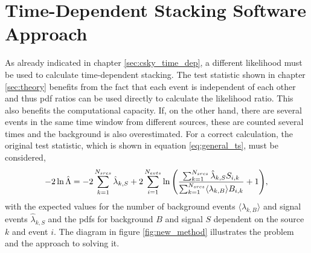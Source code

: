 \chapter{Time-Dependent Stacking Software Approach} \label{sec:tdepps}

As already indicated in chapter \ref{sec:csky_time_dep}, a different likelihood must be used to calculate time-dependent stacking.
The test statistic shown in chapter \ref{sec:theory} benefits from the fact that each event is independent of each other and thus pdf ratios can be used directly to calculate the likelihood ratio.
This also benefits the computational capacity.
If, on the other hand, there are several events in the same time window from different sources, these are counted several times and the background is also overestimated.
For a correct calculation, the original test statistic, which is shown in equation \eqref{eq:general_ts}, must be considered,
\begin{equation}
    -2\ln{\hat{\Lambda}} = -2\sum_{k=1}^{N_{srcs}}\hat{\lambda}_{k,S} + 2\sum_{i=1}^{N_{evts}}\ln{\left(\frac{\sum_{k=1}^{N_{srcs}}\hat{\lambda}_{k,S}S_{i,k}}{\sum_{k=1}^{N_{srcs}}\langle\lambda_{k,B}\rangle B_{i,k}}+1\right)} \label{eq:general_ts}, \\
\end{equation}
with the expected values for the number of background events $\langle\lambda_{k,B}\rangle$ and signal events  $\hat{\lambda}_{k,S}$ and the pdfs for background $B$ and signal $S$ dependent on the source $k$ and event $i$.
The diagram in figure \ref{fig:new_method} illustrates the problem and the approach to solving it.

